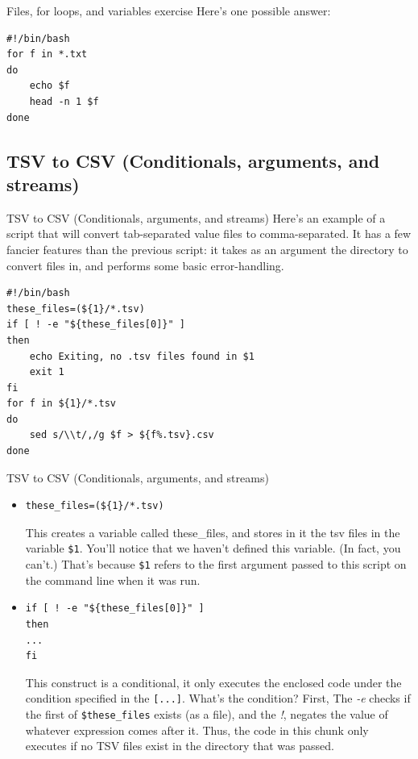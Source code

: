 \documentclass{beamer}
\begin{document}
\begin{frame}[fragile]{Files, for loops, and variables exercise}
Here's one possible answer:
\begin{lstlisting}[title=text\_preview.sh]
#!/bin/bash
for f in *.txt
do
    echo $f
    head -n 1 $f
done
\end{lstlisting}
\end{frame}

\subsection{TSV to CSV (Conditionals, arguments, and streams)}
\begin{frame}[fragile]{TSV to CSV (Conditionals, arguments, and streams)}
Here's an example of a script that will convert tab-separated value files to comma-separated. It has a few fancier features than the previous script: it takes as an argument the directory to convert files in, and performs some basic error-handling.
\begin{lstlisting}[title=tsv\_to\_csv.sh]
#!/bin/bash
these_files=(${1}/*.tsv)
if [ ! -e "${these_files[0]}" ]
then
    echo Exiting, no .tsv files found in $1
    exit 1
fi 
for f in ${1}/*.tsv
do
    sed s/\\t/,/g $f > ${f%.tsv}.csv
done
\end{lstlisting}
\end{frame}


\begin{frame}[fragile]{TSV to CSV (Conditionals, arguments, and streams)}
\begin{itemize}
\item<1->
\begin{lstlisting}
these_files=(${1}/*.tsv)
\end{lstlisting}
This creates a variable called these\_files, and stores in it the tsv files in the variable \lstinline|$1|. You'll notice that we haven't defined this variable. (In fact, you can't.) That's because \lstinline|$1| refers to the first argument passed to this script on the command line when it was run.
\item<2->
\begin{lstlisting}
if [ ! -e "${these_files[0]}" ]
then
...
fi
\end{lstlisting} 
This construct is a conditional, it only executes the enclosed code under the condition specified in the \lstinline|[...]|. What's the condition? First,  The \emph{-e} checks if the first of \lstinline|$these_files| exists (as a file), and the \emph{!}, negates the value of whatever expression comes after it. Thus, the code in this chunk only executes if no TSV files exist in the directory that was passed.
\end{itemize}
\end{frame}
\end{document}
